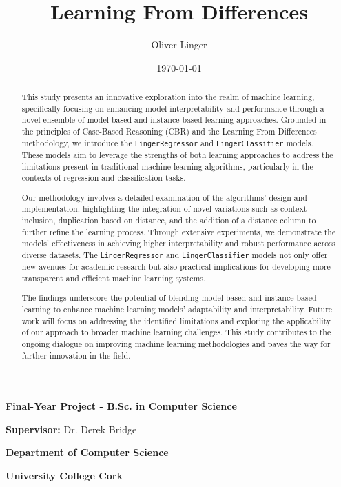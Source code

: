 \documentclass[a4paper, 12pt]{report}
\title{Learning From Differences}
\author{Oliver Linger}
\date{\today}
\begin{document}
\maketitle

\vspace*{\fill} %

\centering
\textbf{Final-Year Project - B.Sc. in Computer Science}

\textbf{Supervisor:} Dr. Derek Bridge

\textbf{Department of Computer Science}

\textbf{University College Cork}

\vspace*{\fill} %

\begin{abstract}
    This study presents an innovative exploration into the realm of machine learning, specifically focusing on enhancing model interpretability and 
    performance through a novel ensemble of model-based and instance-based learning approaches. Grounded in the principles of Case-Based Reasoning (CBR) 
    and the Learning From Differences methodology, we introduce the \texttt{LingerRegressor} and \texttt{LingerClassifier} models. These models aim to leverage the strengths 
    of both learning approaches to address the limitations present in traditional machine learning algorithms, particularly in the contexts of regression and classification tasks.

    Our methodology involves a detailed examination of the algorithms' design and implementation, highlighting the integration of novel variations such as context inclusion, 
    duplication based on distance, and the addition of a distance column to further refine the learning process. Through extensive experiments, we demonstrate the models' 
    effectiveness in achieving higher interpretability and robust performance across diverse datasets. The \texttt{LingerRegressor} and \texttt{LingerClassifier} models not 
    only offer new avenues for academic research but also practical implications for developing more transparent and efficient machine learning systems.
    
    The findings underscore the potential of blending model-based and instance-based learning to enhance machine learning models' adaptability and interpretability. 
    Future work will focus on addressing the identified limitations and exploring the applicability of our approach to broader machine learning challenges.
    This study contributes to the ongoing dialogue on improving machine learning methodologies and paves the way for further innovation in the field.
\end{abstract}
\end{document}
